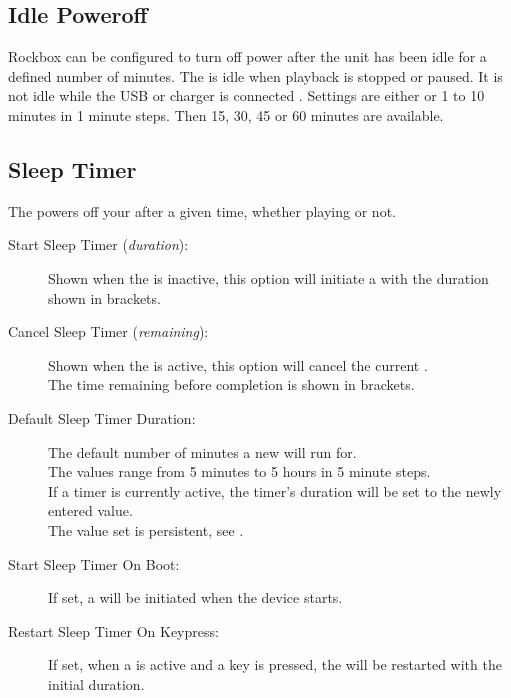 
\subsection{\label{ref:IdlePoweroffSetting}Idle Poweroff}
  Rockbox can be configured to turn off power after the unit has been idle for
  a defined number of minutes. The \dap{} is idle when playback is stopped or
  paused. It is not idle while the USB or charger is connected
  .
  Settings are either  or 1 to 10 minutes in 1 minute steps. Then
  15, 30, 45 or 60 minutes are available.

\subsection{Sleep Timer}
  The  powers off your \dap{} after a given time, whether
  playing or not.
  \begin{description}
    \item[Start Sleep Timer (\emph{duration}):]
      Shown when the  is inactive, this option will
      initiate a  with the duration shown in brackets.
    \item[Cancel Sleep Timer (\emph{remaining}):]
      Shown when the  is active, this option will cancel
      the current .\\
      The time remaining before completion is shown in brackets.
    \item[Default Sleep Timer Duration:]
      The default number of minutes a new  will run
      for.\\
      The values range from 5 minutes to 5 hours in 5 minute steps.\\
      If a timer is currently active, the timer's duration will be set to the
      newly entered value.\\
      The value set is persistent, see .
    \item[Start Sleep Timer On Boot:]
      If set, a  will be initiated when the device
      starts.
    \item[Restart Sleep Timer On Keypress:]
      If set, when a  is active and a key is pressed, the
       will be restarted with the initial duration.
  \end{description}
